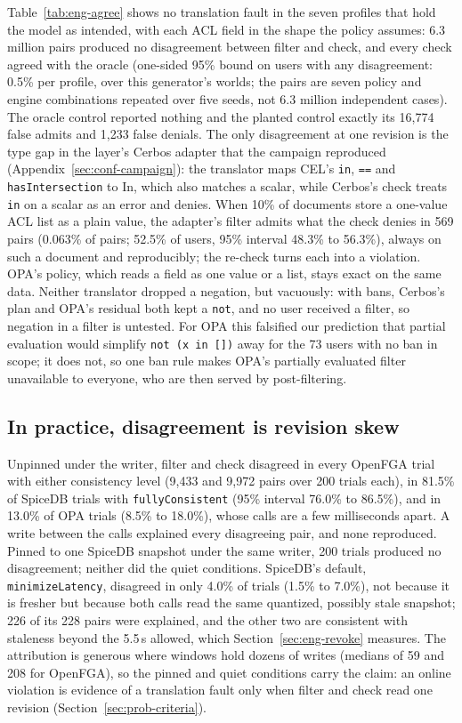 Table~\ref{tab:eng-agree} shows no translation fault in the seven profiles that hold the model as
intended, with each ACL field in the shape the policy assumes: 6.3 million pairs produced no
disagreement between filter and check, and every check agreed
with the oracle (one-sided 95\% bound on users with any disagreement: 0.5\% per profile, over this generator's worlds; the pairs are seven policy and engine combinations repeated over five seeds, not 6.3 million independent cases). The
oracle control reported nothing and the planted control exactly its 16,774 false admits and 1,233
false denials. The only disagreement at one revision is the type gap in the layer's Cerbos adapter
that the campaign reproduced (Appendix~\ref{sec:conf-campaign}): the translator maps CEL's \texttt{in},
\texttt{==} and \texttt{hasIntersection} to $\mathrm{In}$, which also matches a scalar, while Cerbos's
check treats \texttt{in} on a scalar as an error and denies. When 10\% of documents store a one-value
ACL list as a plain value, the adapter's filter admits what the check denies in 569 pairs (0.063\% of
pairs; 52.5\% of users, 95\%
interval 48.3\% to 56.3\%), always on such a document and reproducibly; the re-check turns each
into a violation. OPA's policy, which reads a field as one value or a list, stays exact on the same
data. Neither translator dropped a negation, but vacuously: with bans, Cerbos's plan and OPA's
residual both kept a \texttt{not}, and no user received a filter, so negation in a filter is untested. For OPA this falsified our
prediction that partial evaluation would simplify \texttt{not (x in [])} away for the 73 users with no
ban in scope; it does not, so one ban rule makes OPA's partially evaluated filter unavailable to
everyone, who are then served by post-filtering.

\subsection{In practice, disagreement is revision skew}\label{sec:eng-skew}

Unpinned under the writer, filter and check disagreed in every OpenFGA trial with either consistency
level (9,433 and 9,972 pairs over 200 trials each), in 81.5\% of SpiceDB trials with
\texttt{fullyConsistent} (95\% interval 76.0\% to 86.5\%), and in 13.0\% of OPA trials (8.5\% to
18.0\%), whose calls are a few milliseconds apart. A write between the calls explained every
disagreeing pair, and none reproduced. Pinned to one SpiceDB snapshot under the same writer, 200
trials produced no disagreement; neither did the quiet conditions. SpiceDB's default,
\texttt{minimizeLatency}, disagreed in only 4.0\% of trials (1.5\% to 7.0\%), not because it is
fresher but because both calls read the same quantized, possibly stale snapshot; 226 of its 228 pairs
were explained, and the other two are consistent with staleness beyond the 5.5\,s allowed, which
Section~\ref{sec:eng-revoke} measures. The attribution is generous where windows hold dozens of writes (medians of 59 and 208 for
OpenFGA), so the pinned and quiet conditions carry the claim: an online violation is evidence of a
translation fault only when filter and check read one revision (Section~\ref{sec:prob-criteria}).

